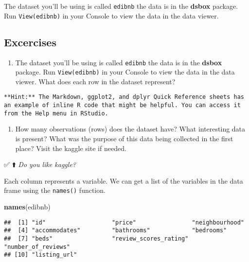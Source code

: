 \documentclass[
]{article}
\newenvironment{Shaded}{\begin{snugshade}}{\end{snugshade}}
\newcommand{\KeywordTok}[1]{\textcolor[rgb]{0.13,0.29,0.53}{\textbf{#1}}}
\newcommand{\NormalTok}[1]{#1}
\providecommand{\tightlist}{%
  \setlength{\itemsep}{0pt}\setlength{\parskip}{0pt}}
\begin{document}
The dataset you'll be using is called \texttt{edibnb} the data is in the
\textbf{dsbox} package. Run \texttt{View(edibnb)} in your Console to
view the data in the data viewer.

\hypertarget{excercises}{%
\subsection{Excercises}\label{excercises}}

\begin{enumerate}
\def\labelenumi{\arabic{enumi}.}
\tightlist
\item
  The dataset you'll be using is called \texttt{edibnb} the data is in
  the \textbf{dsbox} package. Run \texttt{View(edibnb)} in your Console
  to view the data in the data viewer. What does each row in the dataset
  represent?
\end{enumerate}

\begin{verbatim}
**Hint:** The Markdown, ggplot2, and dplyr Quick Reference sheets has an example of inline R code that might be helpful. You can access it from the Help menu in RStudio.
\end{verbatim}

\begin{enumerate}
\def\labelenumi{\arabic{enumi}.}
\setcounter{enumi}{1}
\tightlist
\item
  How many observations (rows) does the dataset have? What interesting
  data is present? What was the purpose of this data being collected in
  the first place? Visit the kaggle site if needed.
\end{enumerate}

✅ ⬆️ \emph{Do you like kaggle?}

Each column represents a variable. We can get a list of the variables in
the data frame using the \texttt{names()} function.

\begin{Shaded}
\begin{Highlighting}[]
\KeywordTok{names}\NormalTok{(edibnb)}
\end{Highlighting}
\end{Shaded}

\begin{verbatim}
##  [1] "id"                   "price"                "neighbourhood"       
##  [4] "accommodates"         "bathrooms"            "bedrooms"            
##  [7] "beds"                 "review_scores_rating" "number_of_reviews"   
## [10] "listing_url"
\end{verbatim}
\end{document}
